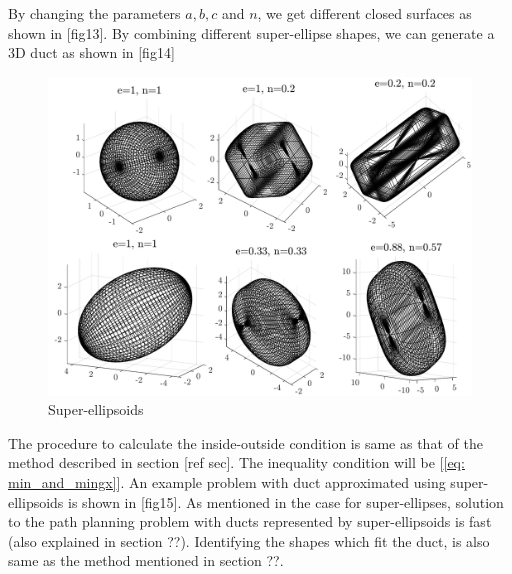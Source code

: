 \documentclass[12pt,a4]{article}
\begin{document}
By changing the parameters $a,b,c$ and $n$, we get different closed surfaces as shown in [fig13]. By combining different super-ellipse shapes, we can generate a 3D duct as shown in [fig14]

\begin{figure}[h!]
\centering
\includegraphics[scale=0.5]{figures/fig13.pdf}
\caption{ Super-ellipsoids \label{fig:SEs}}
\end{figure}

The procedure to calculate the inside-outside condition is same as that of the method described in section [ref sec]. The inequality condition will be [\ref{eq: min_and_mingx}]. An example problem with duct approximated using super-ellipsoids is shown in [fig15]. As mentioned in the case for super-ellipses, solution to the path planning problem with ducts represented by super-ellipsoids is fast (also explained in section ??). Identifying the shapes which fit the duct, is also same as the method mentioned in section ??. 
\end{document}
